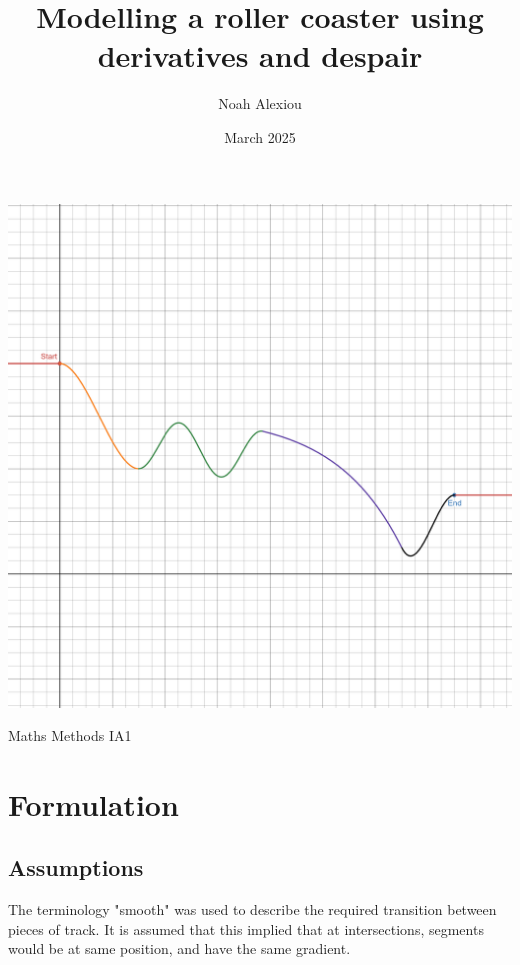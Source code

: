 \documentclass[11pt, letterpaper]{article}
\begin{document}
\begin{titlepage}
	\title{Modelling a roller coaster using derivatives and despair}
	
	\author{Noah Alexiou}


	\date{March 2025}
	
	\maketitle
	\centering
	\includegraphics[width=1\linewidth]{finalgraph.png}
\begin{center}
	\large
	\vfill
	Maths Methods IA1
\end{center}
	
\end{titlepage}


\newpage
\tableofcontents


\newpage


\section{Formulation}
\subsection{Assumptions}


The terminology "smooth" was used to describe the required transition between pieces of track. It is assumed that this implied that at intersections, segments would be at same position, and have the same gradient.
\end{document}
